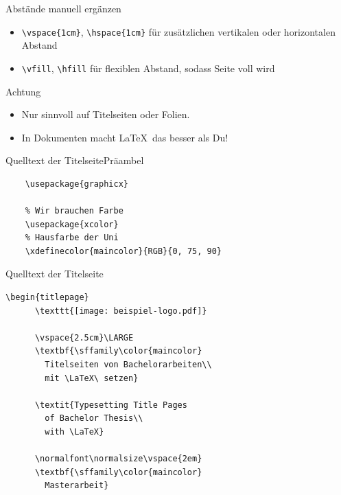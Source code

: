 \begin{Frame}[fragile]{Abstände manuell ergänzen}
  \begin{itemize}
    \item \lstinline-\vspace{1cm}-, \lstinline-\hspace{1cm}-\newline
      für zusätzlichen \alert{v}ertikalen oder \alert{h}orizontalen Abstand
    \item \lstinline-\vfill-, \lstinline-\hfill-\newline
      für flexiblen Abstand, sodass Seite voll wird
  \end{itemize}

  \xxx

  \begin{alertblock}{Achtung}
    \begin{itemize}
      \item Nur sinnvoll auf Titelseiten oder Folien.
      \item In Dokumenten macht \LaTeX\ das besser als Du!
    \end{itemize}
  \end{alertblock}
\end{Frame}

\begin{Frame}[fragile]{Quelltext der Titelseite}{Präambel}
  \begin{lstlisting}[gobble=4]
    % Wir wollen das Logo als Grafik einbinden
    \usepackage{graphicx}
    
    % Wir brauchen Farbe
    \usepackage{xcolor}
    % Hausfarbe der Uni
    \xdefinecolor{maincolor}{RGB}{0, 75, 90}
  \end{lstlisting}
\end{Frame}

\begin{Frame}[fragile]{Quelltext der Titelseite}
  \begin{lstlisting}[gobble=4,frame=topline]
    \begin{titlepage}
      \texttt{[image: beispiel-logo.pdf]}
      
      \vspace{2.5cm}\LARGE
      \textbf{\sffamily\color{maincolor}
        Titelseiten von Bachelorarbeiten\\
        mit \LaTeX\ setzen}

      \textit{Typesetting Title Pages
        of Bachelor Thesis\\
        with \LaTeX}

      \normalfont\normalsize\vspace{2em}
      \textbf{\sffamily\color{maincolor}
        Masterarbeit}
  \end{lstlisting}
\end{Frame}

